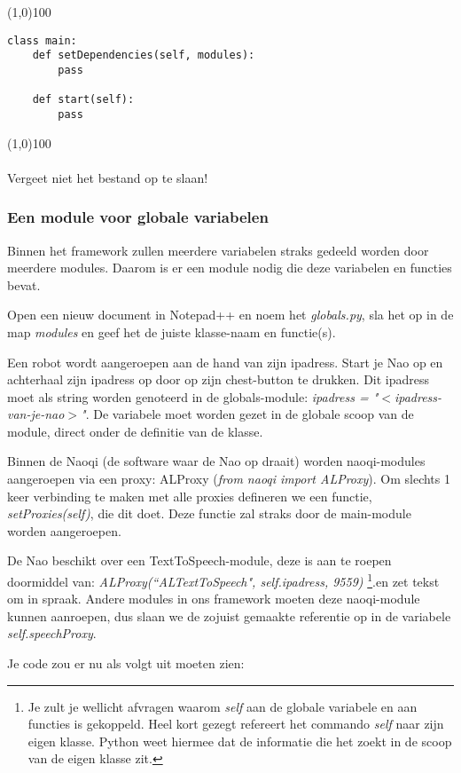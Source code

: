 \documentclass[a4paper]{article}
\begin{document}
\noindent \line(1,0){100}
\begin{verbatim}
class main:
    def setDependencies(self, modules):
        pass

    def start(self):
        pass
\end{verbatim}
\noindent \line(1,0){100}
\\\\
Vergeet niet het bestand op te slaan!

\subsubsection{Een module voor globale variabelen}
Binnen het framework zullen meerdere variabelen straks gedeeld worden door meerdere modules. Daarom is er een module nodig die deze variabelen en functies bevat.

Open een nieuw document in Notepad++ en noem het \textit{globals.py}, sla het op in de map \textit{modules} en geef het de juiste klasse-naam en functie(s). 

Een robot wordt aangeroepen aan de hand van zijn ipadress. Start je Nao op en achterhaal zijn ipadress op door op zijn chest-button te drukken. Dit ipadress moet als string worden genoteerd in de globals-module: \textit{ ipadress = "$<$ipadress-van-je-nao$>$"}. De variabele moet worden gezet in de globale scoop van de module, direct onder de definitie van de klasse.

Binnen de Naoqi (de software waar de Nao op draait) worden naoqi-modules aangeroepen via een proxy: ALProxy (\textit{from naoqi import ALProxy}). Om slechts 1 keer verbinding te maken met alle proxies defineren we een functie, \textit{setProxies(self)}, die dit doet. Deze functie zal straks door de main-module worden aangeroepen.

De Nao beschikt over een TextToSpeech-module, deze is aan te roepen doormiddel van: \textit{ALProxy(``ALTextToSpeech", self.ipadress, 9559)} \footnote{Je zult je wellicht afvragen waarom \textit{self} aan de globale variabele en aan functies is gekoppeld. Heel kort gezegt refereert het commando \textit{self} naar zijn eigen klasse. Python weet hiermee dat de informatie die het zoekt in de scoop van de eigen klasse zit.}.en zet tekst om in spraak. Andere modules in ons framework moeten deze naoqi-module kunnen aanroepen, dus slaan we de zojuist gemaakte referentie op in de variabele \textit{self.speechProxy}.

Je code zou er nu als volgt uit moeten zien:
\end{document}
